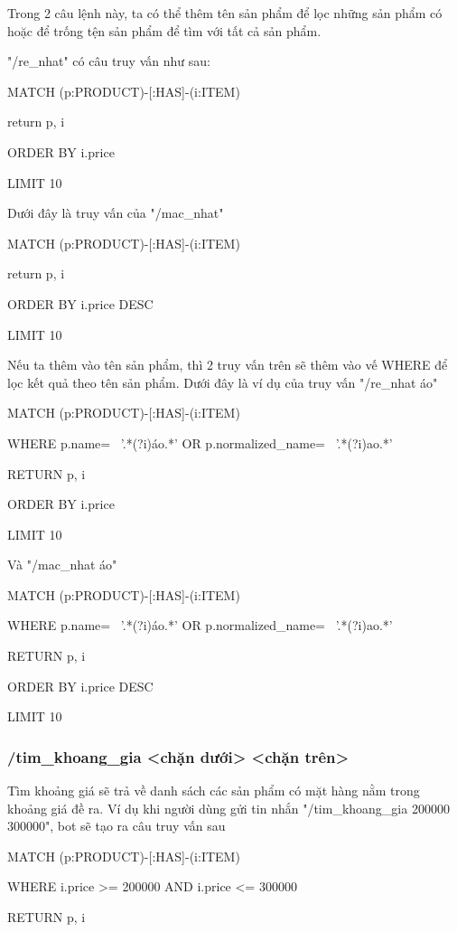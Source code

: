 Trong 2 câu lệnh này, ta có thể thêm tên sản phẩm để lọc những sản phẩm có hoặc để trống tện sản phẩm để tìm với tất cả sản phẩm. 

"/re\_nhat" có câu truy vấn như sau: 

MATCH (p:PRODUCT)-[:HAS]-(i:ITEM)

return p, i 

ORDER BY i.price  

LIMIT 10

\smallskip

Dưới đây là truy vấn của "/mac\_nhat" 

MATCH (p:PRODUCT)-[:HAS]-(i:ITEM)

return p, i 

ORDER BY i.price DESC 

LIMIT 10

\smallskip

Nếu ta thêm vào tên sản phẩm, thì 2 truy vấn trên sẽ thêm vào vế WHERE để lọc kết quả theo tên sản phẩm. Dưới đây là ví dụ của truy vấn "/re\_nhat áo" 

MATCH (p:PRODUCT)-[:HAS]-(i:ITEM)

WHERE p.name=~ '.*(?i)áo.*' OR p.normalized\_name=~ '.*(?i)ao.*' 

RETURN p, i 

ORDER BY i.price  

LIMIT 10

\smallskip

Và "/mac\_nhat áo"

MATCH (p:PRODUCT)-[:HAS]-(i:ITEM)

WHERE p.name=~ '.*(?i)áo.*' OR p.normalized\_name=~ '.*(?i)ao.*' 

RETURN p, i 

ORDER BY i.price DESC 

LIMIT 10

\subsubsection{/tim\_khoang\_gia <chặn dưới> <chặn trên>}

Tìm khoảng giá sẽ trả về danh sách các sản phẩm có mặt hàng nằm trong khoảng giá đề ra. Ví dụ khi người dùng gửi tin nhắn "/tim\_khoang\_gia 200000 300000", bot sẽ tạo ra câu truy vấn sau 

MATCH (p:PRODUCT)-[:HAS]-(i:ITEM)  

WHERE i.price >= 200000 AND i.price <= 300000 

RETURN p, i 


